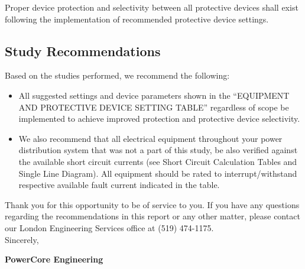 Proper device protection and selectivity between all protective devices shall exist following the implementation of recommended protective device settings.

\pagebreak

\subsection{Study Recommendations}
\label{af:results:afsr}

Based on the studies performed, we recommend the following:
\begin{itemize}
	\item All suggested settings and device parameters shown in the “EQUIPMENT AND PROTECTIVE DEVICE SETTING TABLE” regardless of scope be implemented to achieve improved protection and protective device selectivity.
	\item We also recommend that all electrical equipment throughout your power distribution system that was not a part of this study, be also verified against the available short circuit currents (see Short Circuit Calculation Tables and Single Line Diagram). All equipment should be rated to interrupt/withstand respective
available fault current indicated in the table.
\end{itemize}

\vspace{10mm}
\noindent Thank you for this opportunity to be of service to you.  If you have any questions regarding the recommendations in this report or any other matter, please contact our London Engineering Services office at (519) 474-1175. \newline
\vspace{5mm}
\\
\noindent Sincerely,\newline

\vspace{5mm}
\noindent\textbf{PowerCore Engineering}\newline

